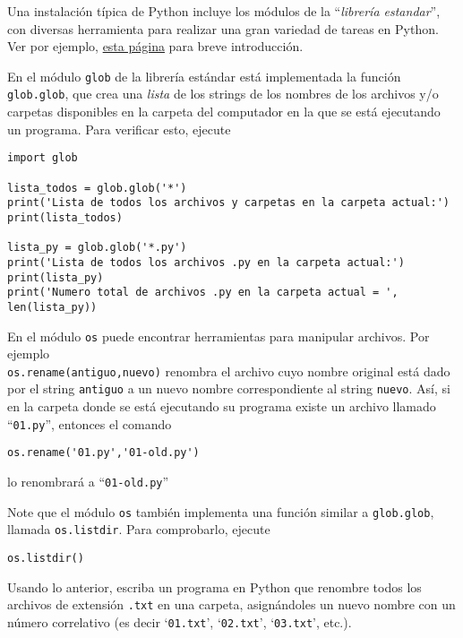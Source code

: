 \documentclass[11pt]{exam}
\begin{document}
\begin{questions}
\item Una instalación típica de Python incluye los módulos de la ``\textit{librería estandar}'', con diversas herramienta para realizar una gran variedad de tareas en Python. Ver por ejemplo, \href{https://docs.python.org/es/3/library/index.html}{esta página} para breve introducción.

\item En el módulo \texttt{glob} de la librería estándar está implementada la función \texttt{glob.glob}, que crea una \textit{lista} de los strings de los nombres de los archivos y/o carpetas disponibles en la carpeta del computador en la que se está ejecutando un programa. Para verificar esto, ejecute

\begin{verbatim}
import glob

lista_todos = glob.glob('*')
print('Lista de todos los archivos y carpetas en la carpeta actual:')
print(lista_todos)

lista_py = glob.glob('*.py')
print('Lista de todos los archivos .py en la carpeta actual:')
print(lista_py)
print('Numero total de archivos .py en la carpeta actual = ', len(lista_py))
\end{verbatim}

\item En el módulo \texttt{os} puede encontrar herramientas para manipular archivos. Por ejemplo \\ \texttt{os.rename(antiguo,nuevo)} renombra el archivo cuyo nombre original está dado por el string \texttt{antiguo} a un nuevo nombre correspondiente al string \texttt{nuevo}. Así, si en la carpeta donde se está ejecutando su programa existe un archivo llamado ``\texttt{01.py}'', entonces el comando 
\begin{verbatim}
os.rename('01.py','01-old.py')
\end{verbatim}

lo renombrará a ``\texttt{01-old.py}''

\item Note que el módulo \texttt{os} también implementa una función similar a \texttt{glob.glob}, llamada \texttt{os.listdir}. Para comprobarlo, ejecute
\begin{verbatim}
os.listdir()
\end{verbatim}

\item Usando lo anterior, escriba un programa en Python que renombre todos los archivos de extensión \texttt{.txt} en una carpeta, asignándoles un nuevo nombre con un número correlativo (es decir `\texttt{01.txt}', `\texttt{02.txt}', `\texttt{03.txt}', etc.).
\end{questions}
\end{document}
